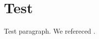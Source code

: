 \documentclass[12pt]{article}
\begin{document}
\section{Test}
Test paragraph. We refereced \cite {supercurves}.



\end{document}

